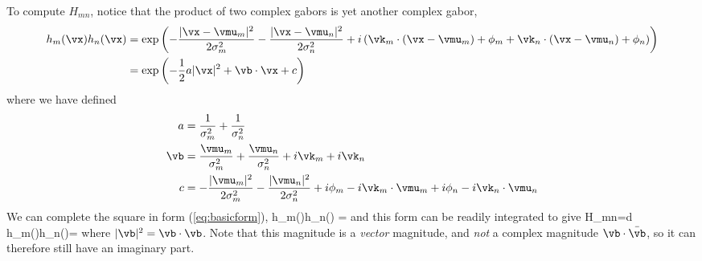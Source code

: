 \documentclass[12pt]{article}
\begin{document}
To compute $H_{mn}$, notice that the product of two complex gabors is yet another complex gabor,
\begin{align}
h_m(\vx)h_n(\vx) &= \exp{\left(-\frac{|\vx-\vmu_m|^2}{2\sigma_m^2}-\frac{|\vx-\vmu_n|^2}{2\sigma_n^2}+i\left(\vk_m\cdot(\vx-\vmu_m)+\phi_m+\vk_n\cdot(\vx-\vmu_n)+\phi_n\right)\right)}\\
&=\exp{\left(-\frac{1}{2}a |\vx|^2+\vb\cdot\vx+c\right)}
\label{eq:basicform}
\end{align}
where we have defined
\begin{align}
a&=\frac{1}{\sigma_m^2}+\frac{1}{\sigma_n^2}\\
\vb&=\frac{\vmu_m}{\sigma_m^2}+\frac{\vmu_n}{\sigma_n^2}+i\vk_m+i\vk_n\\
c&=-\frac{|\vmu_m|^2}{2\sigma_m^2}-\frac{|\vmu_n|^2}{2\sigma_n^2}+i\phi_m-i\vk_m\cdot\vmu_m+i\phi_n-i\vk_n\cdot\vmu_n
\end{align}
We can complete the square in form (\ref{eq:basicform}),
\be
h_m(\vx)h_n(\vx) = 
\ee
and this form can be readily integrated to give
\be
H_{mn}=\int d\vx\, h_m(\vx)h_n(\vx)=
\ee
where $|\vb|^2=\vb\cdot\vb$. Note that this magnitude is a {\it vector} magnitude, and {\it not} a complex magnitude $\vb\cdot\bar{\vb}$, so it can therefore still have an imaginary part.
\end{document}
